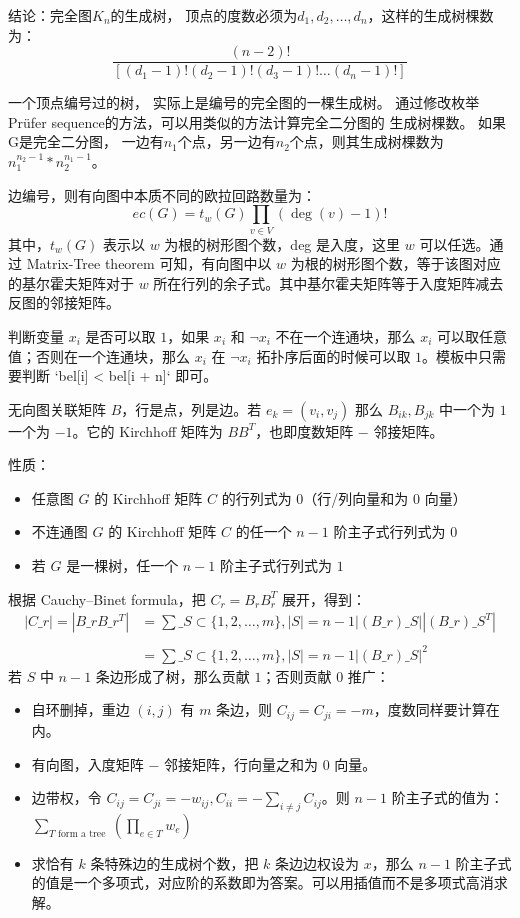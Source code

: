 结论：完全图$K_n$的生成树， 顶点的度数必须为$d_1, d_2, \ldots, d_n$，这样的生成树棵数为：
$$ \frac{(n-2)!}{[(d_1 - 1)! (d_2 - 1)! (d_3 - 1)! \ldots (d_n - 1)!]} $$

一个顶点编号过的树， 实际上是编号的完全图的一棵生成树。 通过修改枚举Prüfer sequence的方法，可以用类似的方法计算完全二分图的
生成树棵数。 如果G是完全二分图， 一边有$n_1$个点，另一边有$n_2$个点，则其生成树棵数为 $n_1 ^ {n_2 - 1} * n_2 ^ {n_1 - 1}$。

边编号，则有向图中本质不同的欧拉回路数量为：
$$
ec(G) = t_w(G) \prod_{v \in V}{(\deg(v) - 1)!}
$$
其中，$t_w(G)$ 表示以 $w$ 为根的树形图个数，deg 是入度，这里 $w$ 可以任选。通过 Matrix-Tree theorem 可知，有向图中以 $w$ 为根的树形图个数，等于该图对应的基尔霍夫矩阵对于 $w$ 所在行列的余子式。其中基尔霍夫矩阵等于入度矩阵减去反图的邻接矩阵。


判断变量 $x_i$ 是否可以取 $1$，如果 $x_i$ 和 $\lnot x_i$ 不在一个连通块，那么 $x_i$ 可以取任意值；否则在一个连通块，那么 $x_i$ 在 $\lnot x_i$ 拓扑序后面的时候可以取 $1$。模板中只需要判断 `bel[i] < bel[i + n]` 即可。


无向图关联矩阵 $B$，行是点，列是边。若 $e_k=(v_i,v_j)$ 那么 $B_{ik},B_{jk}$ 中一个为 $1$ 一个为 $-1$。它的 Kirchhoff 矩阵为 $BB^T$，也即度数矩阵 $-$ 邻接矩阵。

性质：

\begin{itemize}
\item 任意图 $G$ 的 Kirchhoff 矩阵 $C$ 的行列式为 $0$（行/列向量和为 $0$ 向量）
\item 不连通图 $G$ 的 Kirchhoff 矩阵 $C$ 的任一个 $n-1$ 阶主子式行列式为 $0$
\item 若 $G$ 是一棵树，任一个 $n-1$ 阶主子式行列式为 $1$
\end{itemize}

根据 Cauchy–Binet formula，把 $C_r=B_rB_r^T$ 展开，得到：
$$
\begin{aligned}
|C\_r|=|B\_rB\_r^T|&=\sum\_{S\subset \{1,2,\dots,m\},|S|=n-1}|(B\_r)\_S||(B\_r)\_S^T|\\\\
&=\sum\_{S\subset \{1,2,\dots,m\},|S|=n-1}|(B\_r)\_S|^2
\end{aligned}
$$
若 $S$ 中 $n-1$ 条边形成了树，那么贡献 $1$；否则贡献 $0$
推广：

\begin{itemize}
\item 自环删掉，重边 $(i,j)$ 有 $m$ 条边，则 $C_{ij}=C_{ji}=-m$，度数同样要计算在内。
\item 有向图，入度矩阵 $-$ 邻接矩阵，行向量之和为 $0$ 向量。
\item 边带权，令 $C_{ij}=C_{ji}=-w_{ij},C_{ii}=-\sum_{i\neq j}C_{ij}$。则 $n-1$ 阶主子式的值为：$\sum_{T\text{ form a tree }}\left(\prod_{e\in T}w_e\right)$
\item 求恰有 $k$ 条特殊边的生成树个数，把 $k$ 条边边权设为 $x$，那么 $n-1$ 阶主子式的值是一个多项式，对应阶的系数即为答案。可以用插值而不是多项式高消求解。
\end{itemize}

